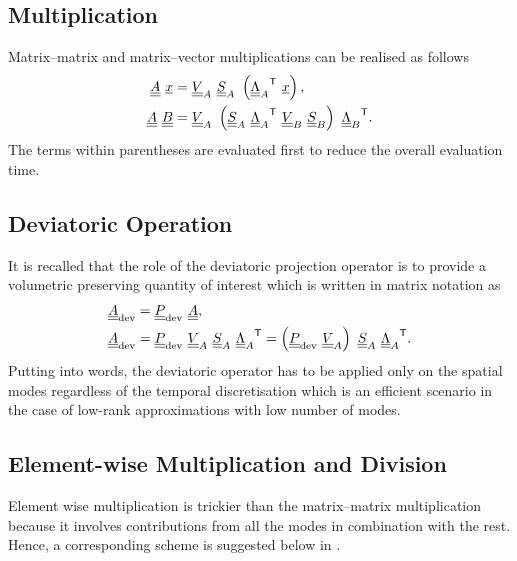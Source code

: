 \subsection{Multiplication}
Matrix--matrix and matrix--vector multiplications can be realised as follows
\begin{align}
	\mA \ \vx & = \mV_A \ \mS_A \ \left( \T{\mLambda_A} \ \vx \right),                            \\
	\mA \ \mB & =  \mV_A \ \left(\mS_A \ \T{\mLambda_A} \ \mV_B \ \mS_B \right) \ \T{\mLambda_B}.
\end{align}
The terms within parentheses are evaluated first to reduce the overall evaluation time.

\subsection{Deviatoric Operation}
It is recalled that the role of the deviatoric projection operator is to provide a volumetric preserving quantity of interest which is written in matrix notation as
\begin{align}
	\mA_{\mathrm{dev}} & = \mat{P}_{\mathrm{dev}} \ \mA,                                                                                                     \\
	\mA_{\mathrm{dev}} & = \mat{P}_{\mathrm{dev}} \ \mV_A \ \mS_A \ \T{\mLambda_A} = \left( \mat{P}_{\mathrm{dev}} \ \mV_A \right) \ \mS_A \ \T{\mLambda_A}.
	\label{eq_dev_pgd}
\end{align}
Putting  into words, the deviatoric operator has to be applied only on the spatial modes regardless of the temporal discretisation which is an efficient scenario in the case of low-rank approximations with low number of modes.

\subsection{Element-wise Multiplication and Division}
Element wise multiplication is trickier than the matrix--matrix multiplication because it involves contributions from all the modes in combination with the rest. Hence, a corresponding scheme is suggested below in .

